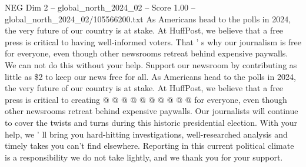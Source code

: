 \begin{textsample}{NEG Dim 2 – global\_north\_2024\_02 – Score 1.00 – global\_north\_2024\_02/105566200.txt}
As Americans head to the polls in 2024, the very future of our country is at stake.
At HuffPost, we believe that a free press is critical to having well-informed voters.
That ' s why our journalism is free for everyone, even though other newsrooms retreat behind expensive paywalls.
We can not do this without your help.
Support our newsroom by contributing as little as \$2 to keep our news free for all.
As Americans head to the polls in 2024, the very future of our country is at stake.
At HuffPost, we believe that a free press is critical to creating @ @ @ @ @ @ @ @ @ @ for everyone, even though other newsrooms retreat behind expensive paywalls.
Our journalists will continue to cover the twists and turns during this historic presidential election.
With your help, we ' ll bring you hard-hitting investigations, well-researched analysis and timely takes you can't find elsewhere.
Reporting in this current political climate is a responsibility we do not take lightly, and we thank you for your support.

\end{textsample}
